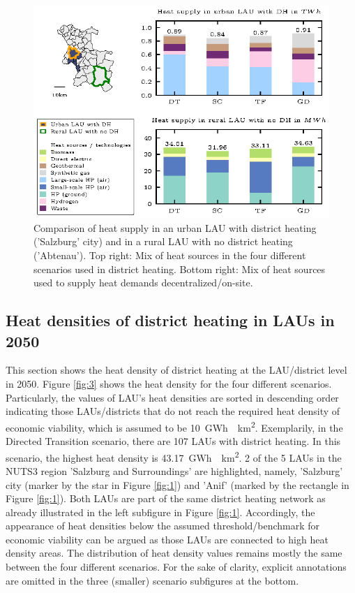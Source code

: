 \begin{figure}[h]
	\centering
	\includegraphics[width=1\linewidth]{figures/lau-supply/supply-salzburg-lau.eps}
	\caption{Comparison of heat supply in an urban LAU with district heating ('Salzburg' city) and in a rural LAU with no district heating ('Abtenau'). Top right: Mix of heat sources in the four different scenarios used in district heating. Bottom right: Mix of heat sources used to supply heat demands decentralized/on-site.}
	\label{fig:2}
\end{figure}

\subsection{Heat densities of district heating in LAUs in 2050}\label{results3}
This section shows the heat density of district heating at the LAU/district level in 2050. Figure \ref{fig:3} shows the heat density for the four different scenarios. Particularly, the values of LAU's heat densities are sorted in descending order indicating those LAUs/districts that do not reach the required heat density of economic viability, which is assumed to be \SI{10}{GWh \per km^2}. Exemplarily, in the Directed Transition scenario, there are 107 LAUs with district heating. In this scenario, the highest heat density is \SI{43.17}{GWh \per km^2}. 2 of the 5 LAUs in the NUTS3 region 'Salzburg and Surroundings' are highlighted, namely, 'Salzburg' city (marker by the star in Figure \ref{fig:1}) and 'Anif' (marked by the rectangle in Figure \ref{fig:1}). Both LAUs are part of the same district heating network as already illustrated in the left subfigure in Figure \ref{fig:1}. Accordingly, the appearance of heat densities below the assumed threshold/benchmark for economic viability can be argued as those LAUs are connected to high heat density areas. The distribution of heat density values remains mostly the same between the four different scenarios. For the sake of clarity, explicit annotations are omitted in the three (smaller) scenario subfigures at the bottom. 

